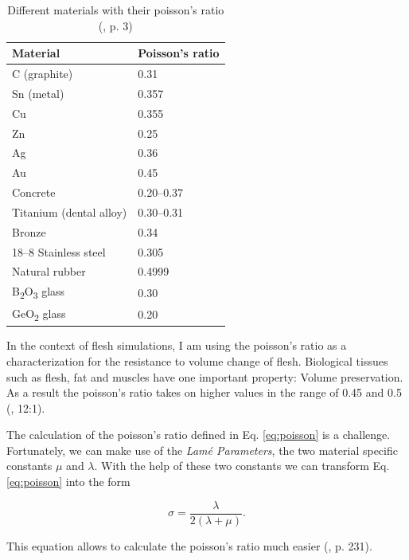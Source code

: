 \begin{table}[!htbp]
\centering
    \begin{tabular}{ | l | l |}
    \hline
    \textbf{Material} & \textbf{Poisson's ratio} \\ \hline
    C (graphite) & 0.31 \\ \hline
    Sn (metal) & 0.357 \\ \hline
    Cu & 0.355 \\ \hline
    Zn & 0.25 \\ \hline
    Ag & 0.36 \\ \hline
    Au & 0.45 \\ \hline
    Concrete & 0.20–0.37 \\ \hline
    Titanium (dental alloy) & 0.30–0.31 \\ \hline
    Bronze & 0.34 \\ \hline
    18–8 Stainless steel & 0.305 \\ \hline
    Natural rubber & 0.4999 \\ \hline
	B\textsubscript{2}O\textsubscript{3} glass & 0.30 \\ \hline
	GeO\textsubscript{2} glass & 0.20 \\ \hline	
    \end{tabular}
    \caption[Materials with their poisson's ratio]{Different materials with their poisson's ratio (\cite{PhysRevB.80.132104}, p. 3)}
\label{table:1}
\end{table}

In the context of flesh simulations, I am using the poisson's ratio as a characterization for the resistance to volume change of flesh. Biological tissues such as flesh, fat and muscles have one important property: Volume preservation. As a result the poisson's ratio takes on higher values in the range of 0.45 and 0.5 (\cite{Smith:2018:SNF:3191713.3180491}, 12:1).

The calculation of the poisson's ratio defined in Eq. \ref{eq:poisson} is a challenge. Fortunately, we can make use of the \textit{Lamé Parameters}, the two material specific constants $\mu$ and $\lambda$. With the help of these two constants we can transform Eq. \ref{eq:poisson} into the form

\begin{equation}\label{eq:poisson_ratio}
\sigma =  \frac{\lambda}{2(\lambda + \mu)}.
\end{equation}

This equation allows to calculate the poisson's ratio much easier (\cite{BERGSTROM2015209}, p. 231). 







